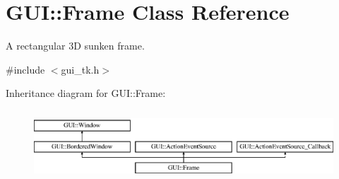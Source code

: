 \hypertarget{classGUI_1_1Frame}{\section{G\-U\-I\-:\-:Frame Class Reference}
\label{classGUI_1_1Frame}
}


A rectangular 3\-D sunken frame.  




{\ttfamily \#include $<$gui\-\_\-tk.\-h$>$}

Inheritance diagram for G\-U\-I\-:\-:Frame\-:\begin{figure}[H]
\begin{center}
\leavevmode
\includegraphics[height=2.654028cm]{classGUI_1_1Frame}
\end{center}
\end{figure}
